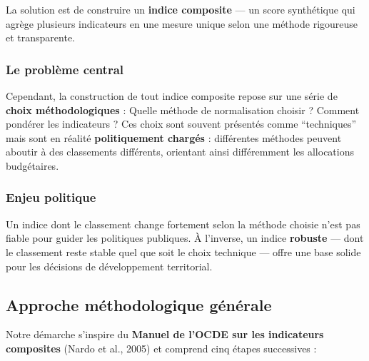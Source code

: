 \documentclass[
]{article}
\begin{document}
La solution est de construire un \textbf{indice composite} --- un score
synthétique qui agrège plusieurs indicateurs en une mesure unique selon
une méthode rigoureuse et transparente.

\subsubsection{Le problème central}\label{le-probluxe8me-central}

Cependant, la construction de tout indice composite repose sur une série
de \textbf{choix méthodologiques} : Quelle méthode de normalisation
choisir ? Comment pondérer les indicateurs ? Ces choix sont souvent
présentés comme ``techniques'' mais sont en réalité
\textbf{politiquement chargés} : différentes méthodes peuvent aboutir à
des classements différents, orientant ainsi différemment les allocations
budgétaires.

\noindent{}

\subsubsection{Enjeu politique}\label{enjeu-politique}

Un indice dont le classement change fortement selon la méthode choisie
n'est pas fiable pour guider les politiques publiques. À l'inverse, un
indice \textbf{robuste} --- dont le classement reste stable quel que
soit le choix technique --- offre une base solide pour les décisions de
développement territorial.

\subsection{Approche méthodologique
générale}\label{approche-muxe9thodologique-guxe9nuxe9rale}

Notre démarche s'inspire du \textbf{Manuel de l'OCDE sur les indicateurs
composites} (Nardo et al., 2005) et comprend cinq étapes successives :
\end{document}
